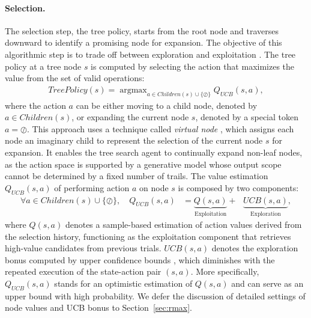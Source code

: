 \paragraph{Selection.}
The selection step, \aka the tree policy, starts from the root node and traverses downward to identify a promising node for expansion.
The objective of this algorithmic step is to trade off between exploration and exploitation \citep{kocsis2006bandit}.
The tree policy at a tree node $s$ is computed by selecting the action that maximizes the value from the set of valid operations:
\begin{align} \label{eq:tree_policy}
    TreePolicy(s) = \mathop{\arg\max}_{a\in Children(s)\cup\{\oslash\}} Q_{UCB}(s, a),
\end{align}
where the action $a$ can be either moving to a child node, denoted by $a\in Children(s)$, or expanding the current node $s$, denoted by a special token $a=\oslash$.
This approach uses a technique called \textit{virtual node} \citep{wang2023dt}, which assigns each node an imaginary child to represent the selection of the current node $s$ for expansion. 
It enables the tree search agent to continually expand non-leaf nodes, as the action space is supported by a generative model whose output scope cannot be determined by a fixed number of trails.
The value estimation $Q_{UCB}(s,a)$ of performing action $a$ on node $s$ is composed by two components:
\begin{align}
    \forall a\in Children(s)\cup\{\oslash\},\quad Q_{UCB}(s, a) &= \underbrace{Q(s, a)}_{\text{Exploitation}} + ~~~ \underbrace{UCB(s, a)}_{\text{Exploration}},
\end{align}
where $Q(s, a)$ denotes a sample-based estimation of action values derived from the selection history, functioning as the exploitation component that retrieves high-value candidates from previous trials. $UCB(s, a)$ denotes the exploration bonus computed by upper confidence bounds \citep[UCB;][]{auer2002using}, which diminishes with the repeated execution of the state-action pair $(s,a)$. More specifically, $Q_{UCB}(s, a)$ stands for an optimistic estimation of $Q(s, a)$ and can serve as an upper bound with high probability. We defer the discussion of detailed settings of node values and UCB bonus to Section~\ref{sec:rmax}.

